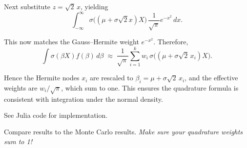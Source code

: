 \documentclass{article}
\begin{document}
\begin{enumerate}
Next substitute $z = \sqrt{2}\,x$, yielding
\[
\int_{-\infty}^\infty \sigma\!\big((\mu+\sigma\sqrt{2}x)X\big)\,
\frac{1}{\sqrt{\pi}} e^{-x^2}\, dx.
\]

This now matches the Gauss--Hermite weight $e^{-x^2}$. Therefore,
\[
\int \sigma(\beta X) f(\beta)\,d\beta 
\;\approx\; \frac{1}{\sqrt{\pi}}
\sum_{i=1}^k w_i \,\sigma\!\big((\mu+\sigma\sqrt{2}\,x_i)X\big).
\]

Hence the Hermite nodes $x_i$ are rescaled to 
$\beta_i = \mu+\sigma\sqrt{2}\,x_i$,
and the effective weights are $w_i/\sqrt{\pi}$, which sum to one. This ensures
the quadrature formula is consistent with integration under the normal density.

See Julia code for implementation.


\begin{tcolorbox}
\item Compare results to the Monte Carlo results. \textit{Make sure your quadrature weights sum to 1!}
\begin{comment}
\begin{table}[htdp]
\caption{True value: 0.5515}
\begin{center}
\begin{tabular}{l r r r }
Method & Points & Error\\
quad & 2597 & 1e-14 \\
monte carlo & 100 & 0.0166\\
Gauss Hermite & 4 & 0.0044234\\
Gauss Hermite & 12 & 0.0044469\\
\end{tabular}
\end{center}
\end{table}
\end{comment}


\end{tcolorbox}
\end{enumerate}
\end{document}
